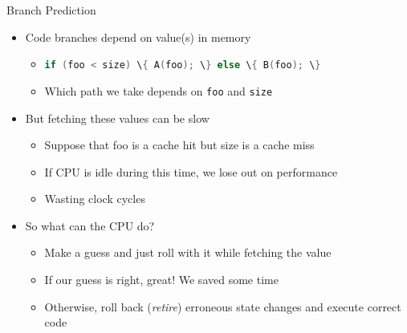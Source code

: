 \documentclass[10pt, dvipsnames, aspectratio=169]{beamer}
\newcommand{\fullframegraphic}[1]{%
    {%
        \setwatermark{}
        \usebackgroundtemplate{\texttt{[image: \#1]}}
        \begin{frame}[plain]
        \end{frame}
    }
}
\let\lsi\lstinline
\newcommand{\code}[1]{\lsi[language=c]|#1|}
\begin{document}
\begin{frame}[c]{Branch Prediction}
  \begin{itemize}
    \item Code branches depend on value(s) in memory
    \begin{itemize}
      \item \code{if (foo < size) \{ A(foo); \} else \{ B(foo); \}}
      \item Which path we take depends on \code{foo} and \code{size}
    \end{itemize}

    \vfill
    \item But fetching these values can be slow
    \begin{itemize}
      \item Suppose that foo is a cache hit but size is a cache miss
      \item If CPU is idle during this time, we lose out on performance
      \item Wasting clock cycles
    \end{itemize}

    \vfill
    \item So what can the CPU do?
    \begin{itemize}
      \item Make a guess and just roll with it while fetching the value
      \item If our guess is right, great! We saved some time
      \item Otherwise, roll back (\textit{retire}) erroneous state changes and execute correct code
    \end{itemize}
  \end{itemize}
\end{frame}

\fullframegraphic{figs/silly/this_is_fine.jpg}
\end{document}
